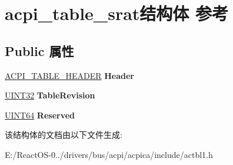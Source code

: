 \hypertarget{structacpi__table__srat}{}\section{acpi\+\_\+table\+\_\+srat结构体 参考}
\label{structacpi__table__srat}
\subsection*{Public 属性}
\begin{DoxyCompactItemize}
\item 
\mbox{\label{structacpi__table__srat_a2d49c312c7475fcebb4b732dd10c9946}} 
\hyperlink{structacpi__table__header}{A\+C\+P\+I\+\_\+\+T\+A\+B\+L\+E\+\_\+\+H\+E\+A\+D\+ER} {\bfseries Header}
\item 
\mbox{\label{structacpi__table__srat_a5bdb2f7b3431b469306cf94794bfdc38}} 
\hyperlink{_processor_bind_8h_ae1e6edbbc26d6fbc71a90190d0266018}{U\+I\+N\+T32} {\bfseries Table\+Revision}
\item 
\mbox{\label{structacpi__table__srat_a85587f407cf14e36a5233b95658e35e2}} 
\hyperlink{_processor_bind_8h_a57be03562867144161c1bfee95ca8f7c}{U\+I\+N\+T64} {\bfseries Reserved}
\end{DoxyCompactItemize}


该结构体的文档由以下文件生成\+:\begin{DoxyCompactItemize}
\item 
E\+:/\+React\+O\+S-\/0../drivers/bus/acpi/acpica/include/actbl1.\+h\end{DoxyCompactItemize}
